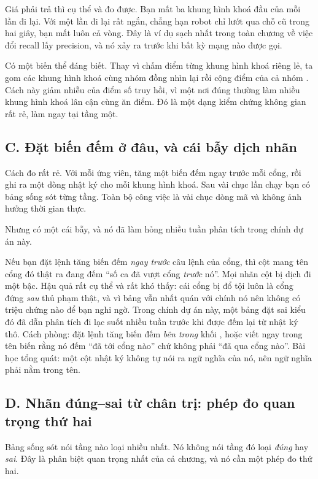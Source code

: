 \documentclass[../../deep_learning.tex]{subfiles}
\begin{document}
Giá phải trả thì cụ thể và đo được. Bạn mất ba khung hình khoá đầu của mỗi lần đi lại. Với một lần đi lại rất ngắn, chẳng hạn robot chỉ lướt qua chỗ cũ trong hai giây, bạn mất luôn cả vòng. Đây là ví dụ sạch nhất trong toàn chương về việc đổi recall lấy precision, và nó xảy ra trước khi bất kỳ mạng nào được gọi.

Có một biến thể đáng biết. Thay vì chấm điểm từng khung hình khoá riêng lẻ, ta gom các khung hình khoá cùng nhóm đồng nhìn lại rồi cộng điểm của cả nhóm \cite{f29galvez2012bags}. Cách này giảm nhiễu của điểm số truy hồi, vì một nơi đúng thường làm nhiều khung hình khoá lân cận cùng ăn điểm. Đó là một dạng kiểm chứng không gian rất rẻ, làm ngay tại tầng một.

\subsection{C. Đặt biến đếm ở đâu, và cái bẫy dịch nhãn}
Cách đo rất rẻ. Với mỗi ứng viên, tăng một biến đếm ngay trước mỗi cổng, rồi ghi ra một dòng nhật ký cho mỗi khung hình khoá. Sau vài chục lần chạy bạn có bảng sống sót từng tầng. Toàn bộ công việc là vài chục dòng mã và không ảnh hưởng thời gian thực.

Nhưng có một cái bẫy, và nó đã làm hỏng nhiều tuần phân tích trong chính dự án này.

\begin{cambay}
Nếu bạn đặt lệnh tăng biến đếm \emph{ngay trước} câu lệnh  của cổng, thì cột mang tên cổng đó thật ra đang đếm ``số ca đã vượt cổng \emph{trước} nó''. Mọi nhãn cột bị dịch đi một bậc. Hậu quả rất cụ thể và rất khó thấy: cái cổng bị đổ tội luôn là cổng đứng \emph{sau} thủ phạm thật, và vì bảng vẫn nhất quán với chính nó nên không có triệu chứng nào để bạn nghi ngờ. Trong chính dự án này, một bảng đặt sai kiểu đó đã dẫn phân tích đi lạc suốt nhiều tuần trước khi được đếm lại từ nhật ký thô. Cách phòng: đặt lệnh tăng biến đếm \emph{bên trong} khối , hoặc viết ngay trong tên biến rằng nó đếm ``đã tới cổng nào'' chứ không phải ``đã qua cổng nào''. Bài học tổng quát: một cột nhật ký không tự nói ra ngữ nghĩa của nó, nên ngữ nghĩa phải nằm trong tên.
\end{cambay}

\subsection{D. Nhãn đúng--sai từ chân trị: phép đo quan trọng thứ hai}
Bảng sống sót nói tầng nào loại nhiều nhất. Nó không nói tầng đó loại \emph{đúng} hay \emph{sai}. Đây là phân biệt quan trọng nhất của cả chương, và nó cần một phép đo thứ hai.
\end{document}
